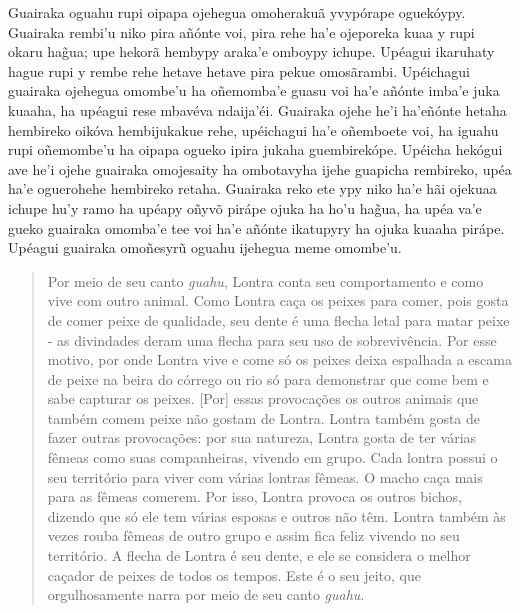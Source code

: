 \begin{itemize}
Guairaka oguahu rupi oipapa ojehegua omoherakuã yvypórape oguekóypy.
Guairaka rembi'u niko pira añónte voi, pira rehe ha'e ojeporeka kuaa y
rupi okaru hag̃ua; upe hekorã hembypy araka'e omboypy ichupe. Upéagui
ikaruhaty hague rupi y rembe rehe hetave hetave pira pekue omosãrambi.
Upéichagui guairaka ojehegua omombe'u ha oñemomba'e guasu voi ha'e
añónte imba'e juka kuaaha, ha upéagui rese mbavéva ndaija'éi. Guairaka
ojehe he'i ha'eñónte hetaha hembireko oikóva hembijukakue rehe,
upéichagui ha'e oñemboete voi, ha iguahu rupi oñemombe'u ha oipapa
ogueko ipira jukaha guembirekópe. Upéicha hekógui ave he'i ojehe
guairaka omojesaity ha ombotavyha ijehe guapicha rembireko, upéa ha'e
oguerohehe hembireko retaha. Guairaka reko ete ypy niko ha'e hãi ojekuaa
ichupe hu'y ramo ha upéapy oñyvõ pirápe ojuka ha ho'u hag̃ua, ha upéa
va'e gueko guairaka omomba'e tee voi ha'e añónte ikatupyry ha ojuka
kuaaha pirápe. Upéagui guairaka omoñesyrũ oguahu ijehegua meme omombe'u.

\begin{quote}
Por meio de seu canto \emph{guahu}, Lontra conta seu comportamento e
como vive com outro animal. Como Lontra caça os peixes para comer, pois
gosta de comer peixe de qualidade, seu dente é uma flecha letal para
matar peixe - as divindades deram uma flecha para seu uso de
sobrevivência. Por esse motivo, por onde Lontra vive e come só os peixes
deixa espalhada a escama de peixe na beira do córrego ou rio só para
demonstrar que come bem e sabe capturar os peixes. {[}Por{]} essas
provocações os outros animais que também comem peixe não gostam de
Lontra. Lontra também gosta de fazer outras provocações: por sua
natureza, Lontra gosta de ter várias fêmeas como suas companheiras,
vivendo em grupo. Cada lontra possui o seu território para viver com
várias lontras fêmeas. O macho caça mais para as fêmeas comerem. Por
isso, Lontra provoca os outros bichos, dizendo que só ele tem várias
esposas e outros não têm. Lontra também às vezes rouba fêmeas de outro
grupo e assim fica feliz vivendo no seu território. A flecha de Lontra é
seu dente, e ele se considera o melhor caçador de peixes de todos os
tempos. Este é o seu jeito, que orgulhosamente narra por meio de seu
canto \emph{guahu}.
\end{quote}


\end{itemize}

